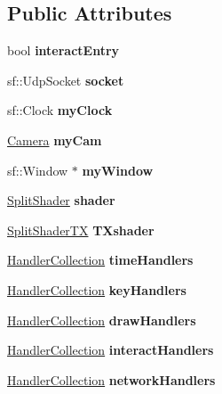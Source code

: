 \subsection*{Public Attributes}
\begin{DoxyCompactItemize}
\item 
\hypertarget{class_engine_af71e99fa44783e7e43d54b1af786d219}{}\label{class_engine_af71e99fa44783e7e43d54b1af786d219} 
bool {\bfseries interact\+Entry}
\item 
\hypertarget{class_engine_ac6f3d9928c249b303891a2dff773637d}{}\label{class_engine_ac6f3d9928c249b303891a2dff773637d} 
sf\+::\+Udp\+Socket {\bfseries socket}
\item 
\hypertarget{class_engine_a5a108a01f06e9874ee4c1fda14ff03d8}{}\label{class_engine_a5a108a01f06e9874ee4c1fda14ff03d8} 
sf\+::\+Clock {\bfseries my\+Clock}
\item 
\hypertarget{class_engine_a82e2503954f7314236e0b50fa5019cd1}{}\label{class_engine_a82e2503954f7314236e0b50fa5019cd1} 
\hyperlink{class_camera}{Camera} {\bfseries my\+Cam}
\item 
\hypertarget{class_engine_ae7e9b4f9b0925005fb117dd1fadcfcfc}{}\label{class_engine_ae7e9b4f9b0925005fb117dd1fadcfcfc} 
sf\+::\+Window $\ast$ {\bfseries my\+Window}
\item 
\hypertarget{class_engine_ad0903c9fe548db11a3483f6dff106209}{}\label{class_engine_ad0903c9fe548db11a3483f6dff106209} 
\hyperlink{class_split_shader}{Split\+Shader} {\bfseries shader}
\item 
\hypertarget{class_engine_ab65a6d60cc6723aa970b42f254f8afbd}{}\label{class_engine_ab65a6d60cc6723aa970b42f254f8afbd} 
\hyperlink{class_split_shader_t_x}{Split\+Shader\+TX} {\bfseries T\+Xshader}
\item 
\hypertarget{class_engine_ab52c953691910ddd4b362e1991f8535b}{}\label{class_engine_ab52c953691910ddd4b362e1991f8535b} 
\hyperlink{class_handler_collection}{Handler\+Collection} {\bfseries time\+Handlers}
\item 
\hypertarget{class_engine_a022168a4bc78cd2b4e09066ce8491810}{}\label{class_engine_a022168a4bc78cd2b4e09066ce8491810} 
\hyperlink{class_handler_collection}{Handler\+Collection} {\bfseries key\+Handlers}
\item 
\hypertarget{class_engine_a7591342e66411592267969adb4902e07}{}\label{class_engine_a7591342e66411592267969adb4902e07} 
\hyperlink{class_handler_collection}{Handler\+Collection} {\bfseries draw\+Handlers}
\item 
\hypertarget{class_engine_a37a58bbf99c4f9f8be327703af07d546}{}\label{class_engine_a37a58bbf99c4f9f8be327703af07d546} 
\hyperlink{class_handler_collection}{Handler\+Collection} {\bfseries interact\+Handlers}
\item 
\hypertarget{class_engine_ac693cf7cd72cdce149af50599c841440}{}\label{class_engine_ac693cf7cd72cdce149af50599c841440} 
\hyperlink{class_handler_collection}{Handler\+Collection} {\bfseries network\+Handlers}
\end{DoxyCompactItemize}


